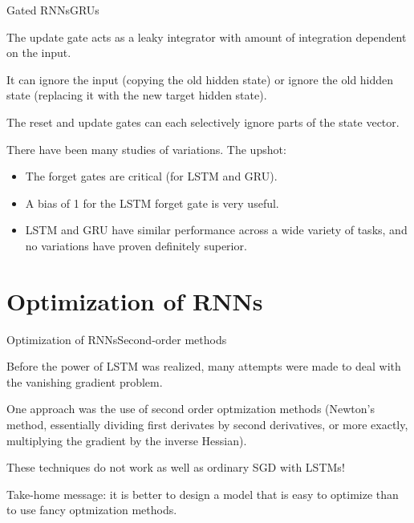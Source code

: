 \documentclass{beamer}
\begin{document}
\begin{frame}{Gated RNNs}{GRUs}

  The update gate acts as a \alert{leaky integrator} with amount of
  integration dependent on the input.

  \medskip

  It can ignore the input (copying the old hidden state)
  or ignore the old hidden state (replacing it with the new target
  hidden state).

  \medskip
  
  The reset and update gates can each selectively ignore parts of the
  state vector.

  \medskip

  There have been many studies of variations. The upshot:
  \begin{itemize}
    \item The \alert{forget gates are critical} (for LSTM and GRU).
    \item A \alert{bias of 1 for the LSTM forget gate} is very useful.
    \item LSTM and GRU have similar performance across a wide variety of
      tasks, and no variations have proven definitely superior.
  \end{itemize}
    
\end{frame}

\section{Optimization of RNNs}

\begin{frame}{Optimization of RNNs}{Second-order methods}

  Before the power of LSTM was realized, many attempts were made to
  deal with the vanishing gradient problem.

  \medskip

  One approach was the use of second order optmization methods (Newton's
  method, essentially dividing first derivates by second derivatives, or
  more exactly, multiplying the gradient by the inverse Hessian).

  \medskip

  These techniques do not work as well as \alert{ordinary SGD with LSTMs}!

  \medskip

  Take-home message: it is better to design a model that is easy to
  optimize than to use fancy optmization methods.
  
\end{frame}
\end{document}
